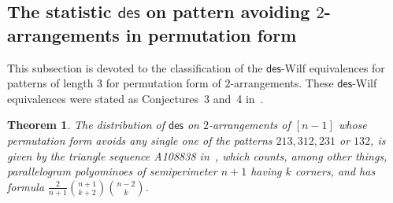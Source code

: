 \documentclass[12pt]{amsart} %
\numberwithin{equation}{section}
\theoremstyle{plain}
\newtheorem{theorem}{Theorem}[section]
\theoremstyle{definition}
\def\des{\mathsf{des}}
\begin{document}
\subsection{The statistic \texorpdfstring{$\des$ on pattern avoiding $2$-arrangements}{des on pattern avoiding 2-arrangements} in permutation form}
This subsection is devoted to the classification of the $\des$-Wilf equivalences  for patterns of length $3$ for permutation form of  $2$-arrangements. These $\des$-Wilf equivalences were stated as Conjectures~3 and~4 in~\cite[Sec.~3.6]{bs}.

\begin{theorem}
The distribution of $\des$ on $2$-arrangements of $[n-1]$ whose permutation form avoids any single one of the patterns $213,312,231$ or $132$, is given by the triangle sequence A108838 in~\cite{oeis}, which counts, among other things, parallelogram polyominoes of semiperimeter $n+1$ having $k$ corners, and has formula $\frac{2}{n+1}\binom{n+1}{k+2}\binom{n-2}{k}$. 
\end{theorem}
\end{document}
